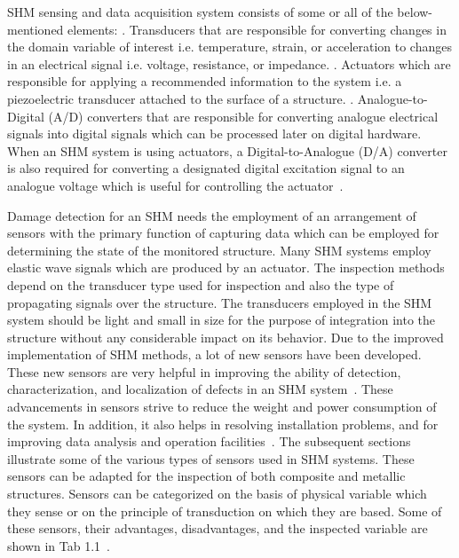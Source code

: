 \documentclass[b5paper, 11pt, titlepage]{book}
\begin{document}
SHM sensing and data acquisition system consists of some or all of the below-mentioned elements:
. Transducers that are responsible for converting changes in the domain variable of interest i.e. temperature, strain, or acceleration to changes in an electrical signal i.e. voltage, resistance, or impedance.
. Actuators which are responsible for applying a recommended information to the system i.e. a piezoelectric transducer attached to the surface of a structure.
. Analogue-to-Digital (A/D) converters that are responsible for converting analogue electrical signals into digital signals which can be processed later on digital hardware. When an SHM system is using actuators, a Digital-to-Analogue (D/A) converter is also required for converting a designated digital excitation signal to an analogue voltage which is useful for controlling the actuator~\cite{TibaduizaBurgos2020, Farrar2012}. 

Damage detection for an SHM needs the employment of an arrangement of sensors with the primary function of capturing data which can be employed for determining the state of the monitored structure. Many SHM systems employ elastic wave signals which are produced by an actuator. The inspection methods depend on the transducer type used for inspection and also the type of propagating signals over the structure. The transducers employed in the SHM system should be light and small in size for the purpose of integration into the structure without any considerable impact on its behavior. Due to the improved implementation of SHM methods, a lot of new sensors have been developed. These new sensors are very helpful in improving the ability of detection, characterization, and localization of defects in an SHM system~\cite{Das2018}. These advancements in sensors strive to reduce the weight and power consumption of the system. In addition, it also helps in resolving installation problems, and for improving data analysis and operation facilities~\cite{TibaduizaBurgos2020}. The subsequent sections illustrate some of the various types of sensors used in SHM systems. These sensors can be adapted for the inspection of both composite and metallic structures. Sensors can be categorized on the basis of physical variable which they sense or on the principle of transduction on which they are based. Some of these sensors, their advantages, disadvantages, and the inspected variable are shown in Tab 1.1~\cite{Farrar2012,TibaduizaBurgos2020}.
\end{document}
